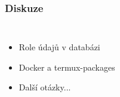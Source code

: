 \documentclass[10pt,xcolor=pdflatex]{beamer}
\begin{document}
\begin{frame}\frametitle{Diskuze}
    \begin{columns}
            \begin{itemize}
            \item{Role údajů v databázi}
            \item{Docker a termux-packages}
            \item{Další otázky...}            \end{itemize}
            \vspace{0.7cm}
            \begin{figure}[b]
            \end{figure}
    \end{columns}
\end{frame}
\end{document}
